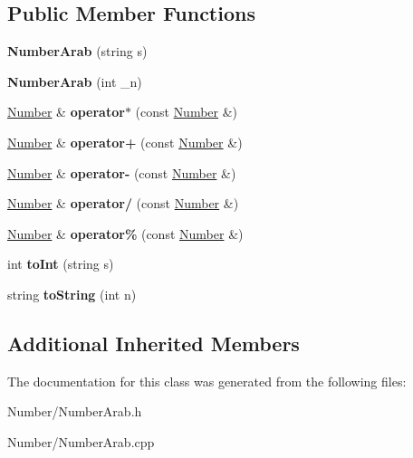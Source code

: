 \subsection*{Public Member Functions}
\begin{DoxyCompactItemize}
\item 
\hypertarget{class_number_arab_a00678a49c958c39afd33c534f339fd97}{}{\bfseries Number\+Arab} (string s)\label{class_number_arab_a00678a49c958c39afd33c534f339fd97}

\item 
\hypertarget{class_number_arab_a8f82bec543e372dc79497b85ced034f2}{}{\bfseries Number\+Arab} (int \+\_\+n)\label{class_number_arab_a8f82bec543e372dc79497b85ced034f2}

\item 
\hypertarget{class_number_arab_ad109f3f6f71f23afbf0307963f1caece}{}\hyperlink{class_number}{Number} \& {\bfseries operator$\ast$} (const \hyperlink{class_number}{Number} \&)\label{class_number_arab_ad109f3f6f71f23afbf0307963f1caece}

\item 
\hypertarget{class_number_arab_affbc62092236a2be0a3531ed6cffbad4}{}\hyperlink{class_number}{Number} \& {\bfseries operator+} (const \hyperlink{class_number}{Number} \&)\label{class_number_arab_affbc62092236a2be0a3531ed6cffbad4}

\item 
\hypertarget{class_number_arab_aaf42752384e031363284af1fd5eea99d}{}\hyperlink{class_number}{Number} \& {\bfseries operator-\/} (const \hyperlink{class_number}{Number} \&)\label{class_number_arab_aaf42752384e031363284af1fd5eea99d}

\item 
\hypertarget{class_number_arab_a739ba55f7e5528182e3caa9e92a34c65}{}\hyperlink{class_number}{Number} \& {\bfseries operator/} (const \hyperlink{class_number}{Number} \&)\label{class_number_arab_a739ba55f7e5528182e3caa9e92a34c65}

\item 
\hypertarget{class_number_arab_a20016c39977b1d9cce1efe841b472453}{}\hyperlink{class_number}{Number} \& {\bfseries operator\%} (const \hyperlink{class_number}{Number} \&)\label{class_number_arab_a20016c39977b1d9cce1efe841b472453}

\item 
\hypertarget{class_number_arab_af11c9dfb3416eb959d33572fdc96412a}{}int {\bfseries to\+Int} (string s)\label{class_number_arab_af11c9dfb3416eb959d33572fdc96412a}

\item 
\hypertarget{class_number_arab_af8be2e0e0b70595b8405a6078a91e717}{}string {\bfseries to\+String} (int n)\label{class_number_arab_af8be2e0e0b70595b8405a6078a91e717}

\end{DoxyCompactItemize}
\subsection*{Additional Inherited Members}


The documentation for this class was generated from the following files\+:\begin{DoxyCompactItemize}
\item 
Number/Number\+Arab.\+h\item 
Number/Number\+Arab.\+cpp\end{DoxyCompactItemize}
